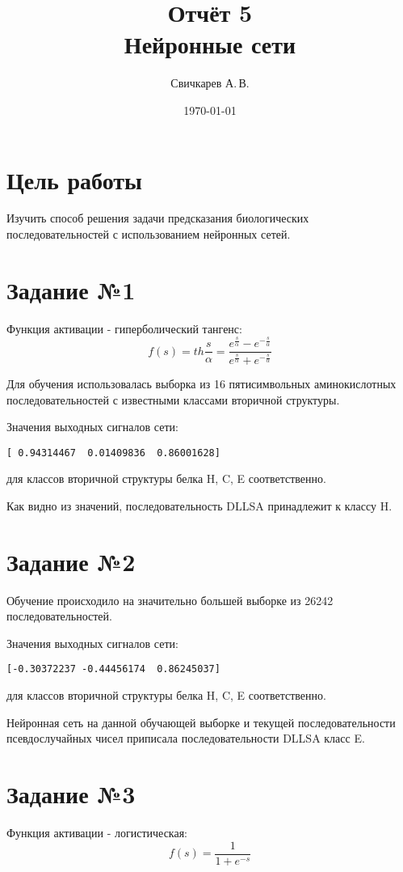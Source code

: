 \documentclass{article} %
\title{Отчёт 5\protect\\Нейронные сети} %
\author{Свичкарев А.\,В.} %
\date{\today} %
\begin{document}

\maketitle %

\section{Цель работы}
Изучить способ решения задачи предсказания биологических последовательностей с использованием нейронных сетей.

\section{Задание №1}
Функция активации - гиперболический тангенс:
\[f(s)=th\frac{s}{\alpha}=\frac{e^\frac{s}{\alpha}-e^{-\frac{s}{\alpha}}}{e^\frac{s}{\alpha}+e^{-\frac{s}{\alpha}}}\]

Для обучения использовалась выборка из 16 пятисимвольных аминокислотных последовательностей с известными классами вторичной структуры.

Значения выходных сигналов сети:
\begin{verbatim}
[ 0.94314467  0.01409836  0.86001628]
\end{verbatim}
для классов вторичной структуры белка H, C, E соответственно.

Как видно из значений, последовательность DLLSA принадлежит к \mbox{классу} H.

\section{Задание №2}

Обучение происходило на значительно большей выборке из 26242 последовательностей. 

Значения выходных сигналов сети:
\begin{verbatim}
[-0.30372237 -0.44456174  0.86245037]
\end{verbatim}
для классов вторичной структуры белка H, C, E соответственно.

Нейронная сеть на данной обучающей выборке и текущей последовательности псевдослучайных чисел приписала последовательности DLLSA класс E.

\section{Задание №3}
Функция активации - логистическая:
\[f(s)=\frac{1}{1+e^{-s}}\]
\end{document}
